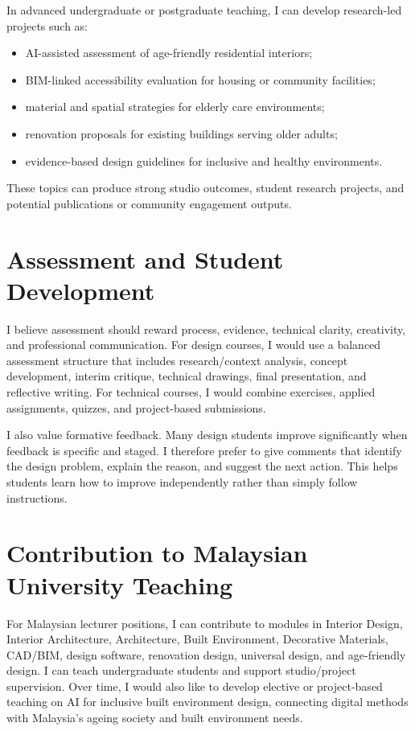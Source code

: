 \documentclass[11pt,a4paper]{article}
\begin{document}
In advanced undergraduate or postgraduate teaching, I can develop research-led projects such as:
\begin{itemize}
  \item AI-assisted assessment of age-friendly residential interiors;
  \item BIM-linked accessibility evaluation for housing or community facilities;
  \item material and spatial strategies for elderly care environments;
  \item renovation proposals for existing buildings serving older adults;
  \item evidence-based design guidelines for inclusive and healthy environments.
\end{itemize}

These topics can produce strong studio outcomes, student research projects, and potential publications or community engagement outputs.

\section*{Assessment and Student Development}
I believe assessment should reward process, evidence, technical clarity, creativity, and professional communication. For design courses, I would use a balanced assessment structure that includes research/context analysis, concept development, interim critique, technical drawings, final presentation, and reflective writing. For technical courses, I would combine exercises, applied assignments, quizzes, and project-based submissions.

I also value formative feedback. Many design students improve significantly when feedback is specific and staged. I therefore prefer to give comments that identify the design problem, explain the reason, and suggest the next action. This helps students learn how to improve independently rather than simply follow instructions.

\section*{Contribution to Malaysian University Teaching}
For Malaysian lecturer positions, I can contribute to modules in Interior Design, Interior Architecture, Architecture, Built Environment, Decorative Materials, CAD/BIM, design software, renovation design, universal design, and age-friendly design. I can teach undergraduate students and support studio/project supervision. Over time, I would also like to develop elective or project-based teaching on AI for inclusive built environment design, connecting digital methods with Malaysia's ageing society and built environment needs.
\end{document}
